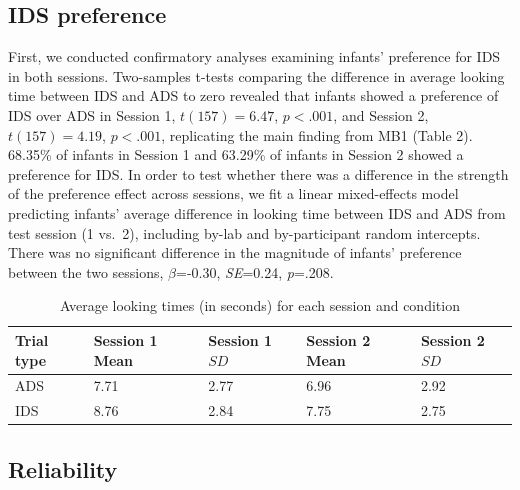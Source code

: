 \documentclass[
  man,floatsintext]{apa6}
\begin{document}
\hypertarget{ids-preference}{%
\subsection{IDS preference}\label{ids-preference}}

First, we conducted confirmatory analyses examining infants' preference for IDS in both sessions. Two-samples t-tests comparing the difference in average looking time between IDS and ADS to zero revealed that infants showed a preference of IDS over ADS in Session 1, \(t(157) = 6.47\), \(p < .001\), and Session 2, \(t(157) = 4.19\), \(p < .001\), replicating the main finding from MB1 (Table 2).
68.35\% of infants in Session 1 and 63.29\% of infants in Session 2 showed a preference for IDS.
In order to test whether there was a difference in the strength of the preference effect across sessions, we fit a linear mixed-effects model predicting infants' average difference in looking time between IDS and ADS from test session (1 vs.~2), including by-lab and by-participant random intercepts.
There was no significant difference in the magnitude of infants' preference between the two sessions, \(\beta\)=-0.30, \emph{SE}=0.24, \emph{p}=.208.

\begin{table}[tbp]

\begin{center}
\begin{threeparttable}

\caption{\label{tab:descriptives_table1}Average looking times (in seconds) for each session and condition}

\begin{tabular}{lllll}
\toprule
Trial type & Session 1 Mean & Session 1 $SD$ & Session 2 Mean & Session 2 $SD$\\
\midrule
ADS & 7.71 & 2.77 & 6.96 & 2.92\\
IDS & 8.76 & 2.84 & 7.75 & 2.75\\
\bottomrule
\end{tabular}

\end{threeparttable}
\end{center}

\end{table}

\hypertarget{reliability}{%
\subsection{Reliability}\label{reliability}}
\end{document}
